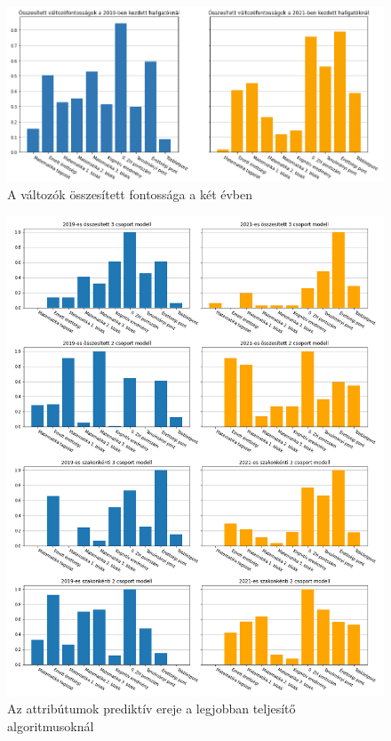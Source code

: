\documentclass[12pt]{article}
\begin{document}
\begin{figure}[H]
\centering
\includegraphics[scale=0.6]{kepek/eves_valtozok.png}
\caption{A változók összesített fontossága a két évben}
\label{fig:variables2}
\end{figure}

\newpage

\begin{figure}[H]
\centering
\includegraphics[scale=0.57]{kepek/modell_valtozo.png}
\caption{Az attribútumok prediktív ereje a legjobban teljesítő algoritmusoknál}
\label{fig:variables}
\end{figure}
\end{document}
